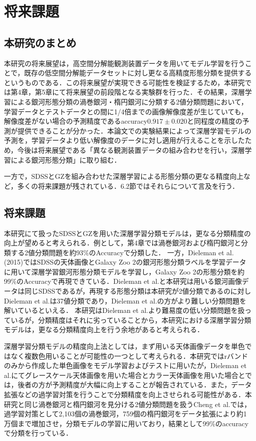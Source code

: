 \documentclass[a4j, 11pt]{jreport}
\begin{document}
\newpage
\chapter{将来課題}
\section{本研究のまとめ}
本研究の将来展望は，高空間分解能観測装置データを用いてモデル学習を行うことで，既存の低空間分解能データセットに対し更なる高精度形態分類を提供するというものである．この将来展望が実現できる可能性を検証するため，本研究では第4章，第5章にて将来展望の前段階となる実験群を行った．その結果，深層学習による銀河形態分類の渦巻銀河・楕円銀河に分類する2値分類問題において，学習データとテストデータとの間に1/4倍までの画像解像度差が生じていても，解像度差がない場合の予測精度であるaccuracy$0.917 \pm 0.020$と同程度の精度の予測が提供できることが分かった．本論文での実験結果によって深層学習モデルの予測を，学習データより低い解像度のデータに対し適用が行えることを示したため，今後は将来展望である「異なる観測装置データの組み合わせを行い，深層学習による銀河形態分類」に取り組む．

一方で，SDSSとGZを組み合わせた深層学習による形態分類の更なる精度向上など，多くの将来課題が残されている．6.2節ではそれらについて言及を行う．

\section{将来課題}
本研究にて扱ったSDSSとGZを用いた深層学習分類モデルは，更なる分類精度の向上が望めると考えられる．例として，第4章では渦巻銀河および楕円銀河と分類する2値分類問題を約93\%のAccuracyで分類した．
一方，Dieleman et al.(2015)\cite{Dieleman2015}ではSDSSの天体画像とGalaxy Zoo 2の銀河形態分類ラベルを学習データに用いて深層学習銀河形態分類モデルを学習し，Galaxy Zoo 2の形態分類を約99\%のAccuracyで再現できている．Dieleman et al.と本研究は用いる銀河画像データは同じSDSSであるが，再現する形態分類は本研究が2値分類であるのに対しDieleman et al.は37値分類であり，Dieleman et al.の方がより難しい分類問題を解いているといえる．
本研究はDieleman et al.より難易度の低い分類問題を扱っているが，分類精度はそれに劣っていることから，本研究における深層学習分類モデルは，更なる分類精度向上を行う余地があると考えられる．

深層学習分類モデルの精度向上法としては，まず用いる天体画像データを単色ではなく複数色用いることが可能性の一つとして考えられる．本研究ではrバンドのみから作成した単色画像をモデル学習およびテストに用いたが，Dieleman et al.にてグレースケール天体画像を用いた場合とカラー天体画像を用いた場合とでは，後者の方が予測精度が大幅に向上することが報告されている．また，データ拡張などの過学習対策を行うことで分類精度を向上させられる可能性がある．本研究と同じ渦巻銀河と楕円銀河を見分ける2値分類問題を扱うCheng et al.では，過学習対策として2,103個の渦巻銀河，759個の楕円銀河をデータ拡張により約1万個まで増加させ，分類モデルの学習に用いており，結果として99\%のaccuracyで分類を行っている．
\end{document}
